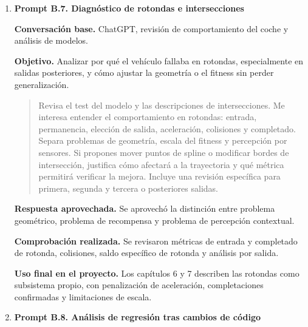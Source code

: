 {\begin{enumerate}[leftmargin=*,itemsep=0.2\baselineskip,topsep=2pt,parsep=0pt,partopsep=0pt]
  \textbf{Respuesta aprovechada.} Se aprovechó la idea de no tratar cada copia fechada como un modelo independiente si sus pesos no aportaban una política distinta.

  \textbf{Comprobación realizada.} Se compararon pesos, informes de test, métricas por sesión y diferencias entre \texttt{SuperCarModel} y \texttt{SessionCarModel}.

  \textbf{Uso final en el proyecto.} El capítulo 6 explica la persistencia de modelos y el capítulo 7 evita sustituir la referencia por sesiones posteriores no reproducibles.

  \item \textbf{Prompt B.7. Diagnóstico de rotondas e intersecciones}

  \textbf{Conversación base.} ChatGPT, revisión de comportamiento del coche y análisis de modelos.

  \textbf{Objetivo.} Analizar por qué el vehículo fallaba en rotondas, especialmente en salidas posteriores, y cómo ajustar la geometría o el fitness sin perder generalización.

  \promptDepurado
  \begin{quote}
  \small
  Revisa el test del modelo y las descripciones de intersecciones. Me interesa entender el comportamiento en rotondas: entrada, permanencia, elección de salida, aceleración, colisiones y completado. Separa problemas de geometría, escala del fitness y percepción por sensores. Si propones mover puntos de spline o modificar bordes de intersección, justifica cómo afectará a la trayectoria y qué métrica permitirá verificar la mejora. Incluye una revisión específica para primera, segunda y tercera o posteriores salidas.
  \end{quote}

  \textbf{Respuesta aprovechada.} Se aprovechó la distinción entre problema geométrico, problema de recompensa y problema de percepción contextual.

  \textbf{Comprobación realizada.} Se revisaron métricas de entrada y completado de rotonda, colisiones, saldo específico de rotonda y análisis por salida.

  \textbf{Uso final en el proyecto.} Los capítulos 6 y 7 describen las rotondas como subsistema propio, con penalización de aceleración, completaciones confirmadas y limitaciones de escala.

  \item \textbf{Prompt B.8. Análisis de regresión tras cambios de código}


\end{enumerate}}
